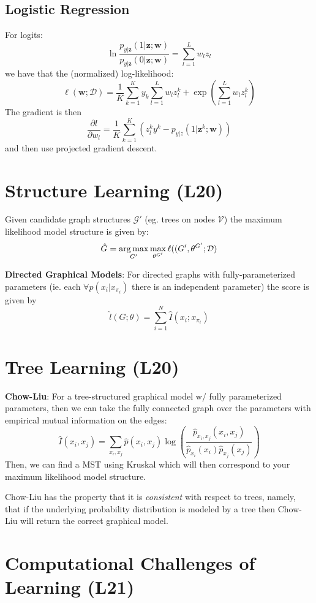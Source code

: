 \documentclass[9pt]{article}
\begin{document}
\begin{multicols}{2}
\subsection{Logistic Regression}
For logits: 
$$\ln\frac{p_{y|\mathbf{z}}(1|\mathbf{z};\mathbf{w})}{p_{y|\mathbf{z}}(0|\mathbf{z};\mathbf{w})}=\sum_{l=1}^{L}w_lz_l$$
we have that the (normalized) log-likelihood:
$$\ell(\mathbf{w};\mathcal{D})=\frac{1}{K}\sum_{k=1}^{K}y_k\sum_{l=1}^{L}w_lz_l^k + \exp\left(
\sum_{l=1}^{L}w_lz_l^k\right)$$
The gradient is then $$\frac{\partial l}{\partial w_l}=\frac{1}{K}
\sum_{k=1}^{K}(z_l^ky^k-p_{y|z}(1|\mathbf{z}^k;\mathbf{w}))$$
and then use projected gradient descent.

\section{Structure Learning (L20)}

Given candidate graph structures $\mathcal{G}'$ (eg. trees on nodes
$\mathcal{V}$) the maximum likelihood model structure is given by:
$$\hat{G}=\operatorname*{arg\,max}_{G'}\max_{\theta^{G'}}\ell((G',\theta^{G'};\mathcal{D})$$

\textbf{Directed Graphical Models}: For directed graphs with 
fully-parameterized parameters (ie. each $\forall p(x_i|x_{\pi_i})$ 
there is an independent parameter) the score is given by
$$\hat{l}(G;\theta)=
\sum_{i=1}^{N}\hat{I}(x_i;x_{\pi_i})$$

\section{Tree Learning (L20)}
\textbf{Chow-Liu}: For a tree-structured graphical model w/
fully parameterized parameters, then we can take the fully
connected graph over the parameters with empirical mutual information on the edges:
$$\hat{I}(x_i,x_j)=\sum_{x_i,x_j}\hat{p}(x_i,x_j)\log\left(\frac{\hat p_{x_i,x_j}(x_i,x_j)}{\hat{p}_{x_i}(x_i)\hat{p}_{x_j}(x_j)}\right)$$ 
Then, we can find a MST using Kruskal which will then correspond to
your maximum likelihood model structure.

Chow-Liu has the property that it is \textit{consistent} with respect to trees, namely, that if the underlying probability distribution is modeled by a tree then Chow-Liu will return the 
correct graphical model.

\section{Computational Challenges of Learning (L21)}


\end{multicols}
\end{document}

